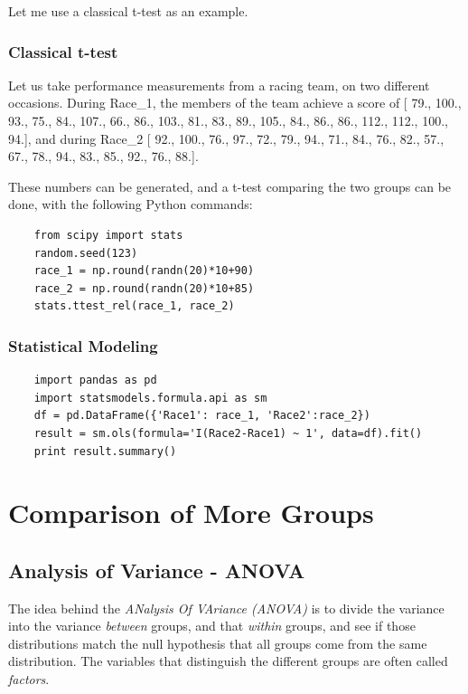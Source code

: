 Let me use a classical t-test as an example.

\subsubsection{Classical t-test}

Let us take performance measurements from a racing team, on two different occasions. During Race\_1, the members of the team achieve a score of [ 79.,  100.,   93.,   75.,   84.,  107.,   66.,   86.,  103.,
         81.,   83.,   89.,  105.,   84.,   86.,   86.,  112.,  112.,
        100.,   94.], and during Race\_2 [  92.,  100.,   76.,   97.,   72.,   79.,   94.,   71.,   84.,
         76.,   82.,   57.,   67.,   78.,   94.,   83.,   85.,   92.,
         76.,   88.].

These numbers can be generated, and a t-test comparing the two groups can be done, with the following Python commands:

\begin{lstlisting}
    from scipy import stats
    random.seed(123)
    race_1 = np.round(randn(20)*10+90)
    race_2 = np.round(randn(20)*10+85)
    stats.ttest_rel(race_1, race_2)
\end{lstlisting}

\subsubsection{Statistical Modeling}

\begin{lstlisting}
    import pandas as pd
    import statsmodels.formula.api as sm
    df = pd.DataFrame({'Race1': race_1, 'Race2':race_2})
    result = sm.ols(formula='I(Race2-Race1) ~ 1', data=df).fit()
    print result.summary()
\end{lstlisting}


\section{Comparison of More Groups}

\subsection{Analysis of Variance - ANOVA} \label{sec:anova}  

The idea behind the \emph{ANalysis Of VAriance (ANOVA)} is to divide the variance into the variance \emph{between} groups, and that \emph{within} groups, and see if those distributions match the null hypothesis that all groups come from the same distribution. The variables that distinguish the different groups are often called \emph{factors}.


